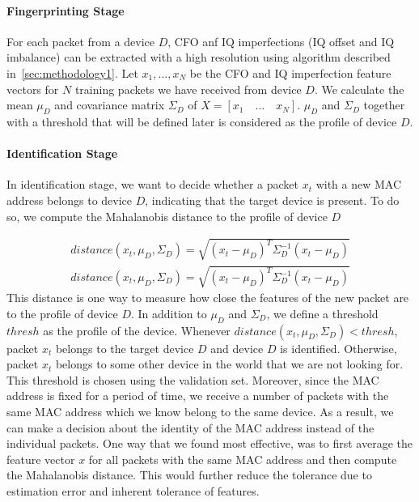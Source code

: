 \paragraph{Fingerprinting Stage} For each packet from a device $D$, CFO anf IQ imperfections (IQ offset and IQ imbalance) can be extracted with a high resolution using algorithm described in~\ref{sec:methodology1}. Let $x_1,...,x_N$ be the CFO and IQ imperfection feature vectors for $N$ training packets we have received from device $D$. We calculate the mean $\mu_D$ and covariance matrix $\Sigma_D$ of $X = [x_1 \quad ... \quad x_N]$. $\mu_D$ and $\Sigma_D$ together with a threshold that will be defined later is considered as the profile of device $D$.



\paragraph{Identification Stage} In identification stage, we want to decide whether a packet $x_t$ with a new MAC address belongs to device $D$, indicating that the target device is present. To do so, we compute the Mahalanobis distance to the profile of device $D$

\begin{gather*}
    distance(x_t,\mu_D,\Sigma_D) = \sqrt{(x_t-\mu_D)^T\Sigma_D^{-1}(x_t-\mu_D)}
\end{gather*}
\begin{gather*}
    distance(x_t,\mu_D,\Sigma_D) = \sqrt{(x_t-\mu_D)^T\Sigma_D^{-1}(x_t-\mu_D)}
\end{gather*}
This distance is one way to measure how close the features of the new packet are to the profile of device $D$. In addition to $\mu_D$ and $\Sigma_D$, we define a threshold $thresh$ as the profile of the device. Whenever $distance(x_t,\mu_D,\Sigma_D)<thresh$, packet $x_t$ belongs to the target device $D$ and device $D$ is identified. Otherwise, packet $x_t$ belongs to some other device in the world that we are not looking for. This threshold is chosen using the validation set.
Moreover, since the MAC address is fixed for a period of time, we receive a number of packets with the same MAC address which we know belong to the same device. As a result, we can make a decision about the identity of the MAC address instead of the individual packets. One way that we found most effective, was to first average the feature vector $x$ for all packets with the same MAC address and then compute the Mahalanobis distance. This would further reduce the tolerance due to estimation error and inherent tolerance of features.


